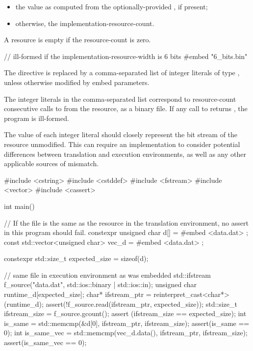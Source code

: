 \begin{itemize}
\item
  the value as computed from the optionally-provided 
  , if present;
\item
  otherwise, the implementation-resource-count.
\end{itemize}

A resource is empty if the resource-count is zero.

\pnum
\begin{example}
\begin{codeblock}
// ill-formed if the implementation-resource-width is 6 bits
#embed "6_bits.bin"
\end{codeblock}
\end{example}

\pnum
The  directive is replaced by a comma-separated list of integer
literals of type , unless otherwise modified by embed
parameters.

\pnum
The integer literals in the comma-separated list correspond to
resource-count consecutive calls to 
from the resource, as a binary file.
If any call to  returns , the program is
ill-formed.

\pnum
\recommended The value of each integer literal should closely represent
the bit stream of the resource unmodified.
This can require an implementation to consider potential differences between
translation and execution environments, as well as any other applicable
sources of mismatch.

\begin{example}
\begin{codeblock}
#include <cstring>
#include <cstddef>
#include <fstream>
#include <vector>
#include <cassert>

int main() {
  // If the file is the same as the resource in the translation environment, no assert in this program should fail.
  constexpr unsigned char d[] = {
#embed <data.dat>
  };
  const std::vector<unsigned char> vec_d = {
#embed <data.dat>
  };

  constexpr std::size_t expected_size = sizeof(d);

  // same file in execution environment as was embedded
  std::ifstream f_source("data.dat", std::ios::binary | std::ios::in);
  unsigned char runtime_d[expected_size];
  char* ifstream_ptr = reinterpret_cast<char*>(runtime_d);
  assert(!f_source.read(ifstream_ptr, expected_size));
  std::size_t ifstream_size = f_source.gcount();
  assert (ifstream_size == expected_size);
  int is_same = std::memcmp(&d[0], ifstream_ptr, ifstream_size);
  assert(is_same == 0);
  int is_same_vec = std::memcmp(vec_d.data(), ifstream_ptr, ifstream_size);
  assert(is_same_vec == 0);
}
\end{codeblock}
\end{example}

